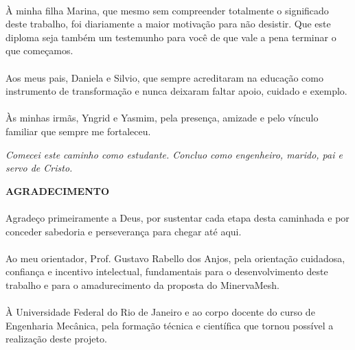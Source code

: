 \paragraph{}À minha filha Marina, que mesmo sem compreender totalmente o significado deste trabalho, foi diariamente a maior motivação para não desistir. Que este diploma seja também um testemunho para você de que vale a pena terminar o que começamos.

\paragraph{}Aos meus pais, Daniela e Silvio, que sempre acreditaram na educação como instrumento de transformação e nunca deixaram faltar apoio, cuidado e exemplo.

\paragraph{}Às minhas irmãs, Yngrid e Yasmim, pela presença, amizade e pelo vínculo familiar que sempre me fortaleceu.

\vspace{1.5cm}
\begin{center}
\textit{Comecei este caminho como estudante. Concluo como engenheiro, marido, pai e servo de Cristo.}
\end{center}

\pagebreak


\begin{center}
\textbf{AGRADECIMENTO}
\end{center}
      \vspace{0.5cm}

\paragraph{}Agradeço primeiramente a Deus, por sustentar cada etapa desta caminhada e por conceder sabedoria e perseverança para chegar até aqui.

\paragraph{}Ao meu orientador, Prof. Gustavo Rabello dos Anjos, pela orientação cuidadosa, confiança e incentivo intelectual, fundamentais para o desenvolvimento deste trabalho e para o amadurecimento da proposta do MinervaMesh.

\paragraph{}À Universidade Federal do Rio de Janeiro e ao corpo docente do curso de Engenharia Mecânica, pela formação técnica e científica que tornou possível a realização deste projeto.

